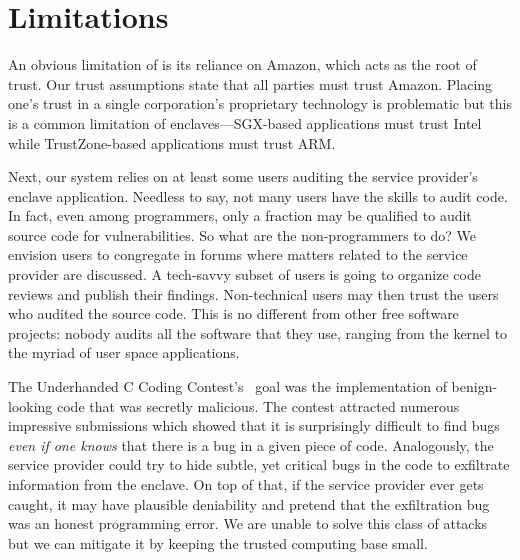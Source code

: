 \section{Limitations}%
\label{sec:limitations}

An obvious limitation of \tool{} is its reliance on Amazon, which acts as the
root of trust.  Our trust assumptions state that all parties must trust Amazon.
Placing one's trust in a single corporation's proprietary technology is
problematic but this is a common limitation of enclaves---SGX-based applications
must trust Intel while TrustZone-based applications must trust ARM.

Next, our system relies on at least some users auditing the service provider's
enclave application.  Needless to say, not many users have the skills to audit
code.  In fact, even among programmers, only a fraction may be qualified to
audit source code for vulnerabilities.  So what are the non-programmers to do?
We envision users to congregate in forums where matters related to the service
provider are discussed.  A tech-savvy subset of users is going to organize code
reviews and publish their findings.  Non-technical users may then trust the
users who audited the source code.  This is no different from other free
software projects: nobody audits all the software that they use, ranging from
the kernel to the myriad of user space applications.

The Underhanded C Coding Contest's~\cite{underhanded-c} goal was the
implementation of benign-looking code that was secretly malicious.  The contest
attracted numerous impressive submissions which showed that it is surprisingly
difficult to find bugs \emph{even if one knows} that there is a bug in a given
piece of code.  Analogously, the service provider could try to hide subtle, yet
critical bugs in the code to exfiltrate information from the enclave.  On top of
that, if the service provider ever gets caught, it may have plausible
deniability and pretend that the exfiltration bug was an honest programming
error.  We are unable to solve this class of attacks but we can mitigate it
by keeping the trusted computing base small.
